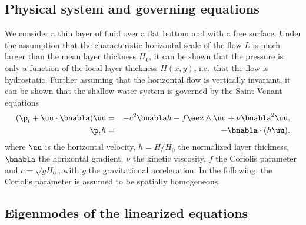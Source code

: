 


\subsection{Physical system and governing equations}

We consider a thin layer of fluid over a flat bottom and with a free
surface.
%
Under the assumption that the characteristic horizontal scale of the
flow $L$ is much larger than the mean layer thickness $H_0$, it can be
shown that the pressure is only a function of the local layer
thickness $H(x, y)$, i.e.\ that the flow is hydrostatic.
%
Further assuming that the horizontal flow is vertically invariant, it
can be shown that the shallow-water system is governed by the
Saint-Venant equations \cite[see for example][]{VallisLIVRE2006}
\begin{eqnarray}
(\p_t + \uu\cdot \bnabla ) \uu   
&=& - c^2 \bnabla h - f \eez \wedge \uu + \nu \bnabla^2 \uu,   \label{eq_uu}\\
\p_t   h    &=& - \bnabla \cdot (h \uu).  \label{eq_h}
\end{eqnarray}
where $\uu$ is the horizontal velocity, %
$h = H/H_0$ the normalized layer thickness, %
$\bnabla$ the horizontal gradient, %
$\nu$ the kinetic viscosity, %
$f$ the Coriolis parameter %
and %
$c = \sqrt{gH_0}$, with $g$ the gravitational acceleration.
%
In the following, the Coriolis parameter is assumed to be spatially
homogeneous.



\subsection{Eigenmodes of the linearized equations}

\label{subsection_eigen}

